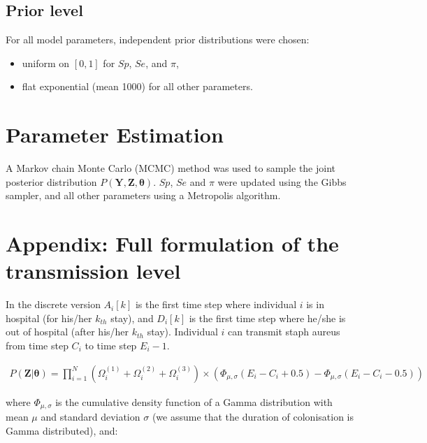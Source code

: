 \documentclass[10pt]{article}
\begin{document}




\subsection*{Prior level}


For all model parameters, independent prior distributions were chosen: 
\begin{itemize}
	\item uniform on $[0,1]$ for $Sp$, $Se$, and $\pi$, 
	\item flat exponential (mean 1000) for all other parameters. 
\end{itemize}

  
\section*{Parameter Estimation}

A Markov chain Monte Carlo (MCMC) method was used to sample the joint
posterior distribution $P\left(\bm{Y},\bm{Z},\bm{\theta}\right)$.
$Sp$, $Se$ and $\pi$ were updated using the Gibbs sampler, and all other parameters using a Metropolis algorithm.


\section*{Appendix: Full formulation of the transmission level}

In the discrete version $A_i[k]$ is the first time step where individual $i$ is in hospital (for his/her $k_{th}$ stay), and $D_i[k]$ is the first time step where he/she is out of hospital (after his/her $k_{th}$ stay). Individual $i$ can transmit staph aureus from time step $C_i$ to time step $E_i-1$. 

\begin{eqnarray*}
P\left(\bm{Z}|\bm{\theta}\right) = 
\bm{\prod}_{i=1}^N %
\left( \Omega_i^{\left(1\right)} + \Omega_i^{\left(2\right)} + \Omega_i^{\left(3\right)} \right) \times \left(\Phi_{\mu,\sigma}\left(E_i-C_i+0.5\right) - \Phi_{\mu,\sigma}\left(E_i-C_i-0.5\right) \right)
\end{eqnarray*}

\noindent where $\Phi_{\mu,\sigma}$ is the cumulative density function of a Gamma distribution with mean $\mu$ and standard deviation $\sigma$ (we assume that the duration of colonisation is Gamma distributed), and: 
\end{document}
